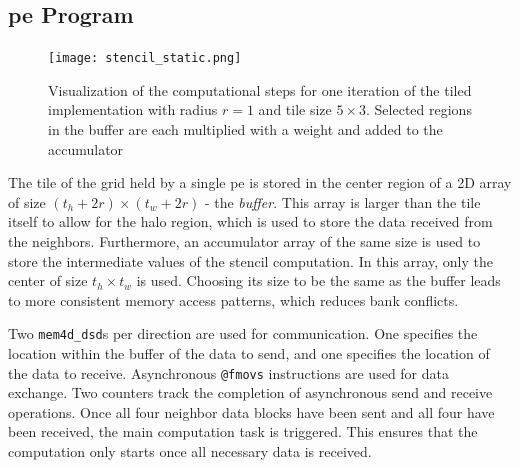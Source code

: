 \subsection{\ac{pe} Program}


\begin{figure}
    \centering
    \texttt{[image: stencil\_static.png]}
    \caption{Visualization of the computational steps for one iteration of the tiled implementation with radius $r=1$ and tile size $5\times 3$. Selected regions in the buffer are each multiplied with a weight and added to the accumulator}
    \label{fig:stencil_algorithm_animation}
\end{figure}

The tile of the grid held by a single \ac{pe} is stored in the center region of a 2D array of size $(t_h+2r)\times (t_w+2r)$ - the \emph{buffer}. This array is larger than the tile itself to allow for the halo region, which is used to store the data received from the neighbors. Furthermore, an accumulator array of the same size is used to store the intermediate values of the stencil computation. In this array, only the center of size $t_h \times t_w$ is used. Choosing its size to be the same as the buffer leads to more consistent memory access patterns, which reduces bank conflicts.

Two \texttt{mem4d\_dsd}s per direction are used for communication. One specifies the location within the buffer of the data to send, and one specifies the location of the data to receive.
Asynchronous \texttt{@fmovs} instructions are used for data exchange. Two counters track the completion of asynchronous send and receive operations. Once all four neighbor data blocks have been sent and all four have been received, the main computation task is triggered. This ensures that the computation only starts once all necessary data is received.

